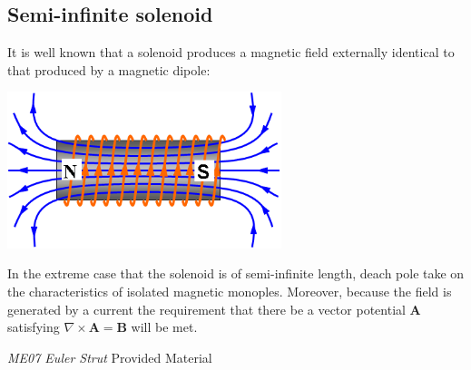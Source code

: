 \documentclass[twocolumn]{article}
\begin{document}
\subsection{Semi-infinite solenoid}
It is well known that a solenoid produces a magnetic field externally identical to that produced by a magnetic dipole:

\noindent
\includegraphics[width=80mm]{solenoid.png}

\noindent
In the extreme case that the solenoid is of semi-infinite length, deach pole take on the characteristics of isolated magnetic monoples. Moreover, because the field is generated by a current the requirement that there be a vector potential $\mathbf A$ satisfying $\nabla \times \mathbf A = \mathbf B$ will be met.

\newpage
\begin{thebibliography}{9}
 \emph{ME07 Euler Strut} Provided Material
\end{thebibliography}
\end{document}
